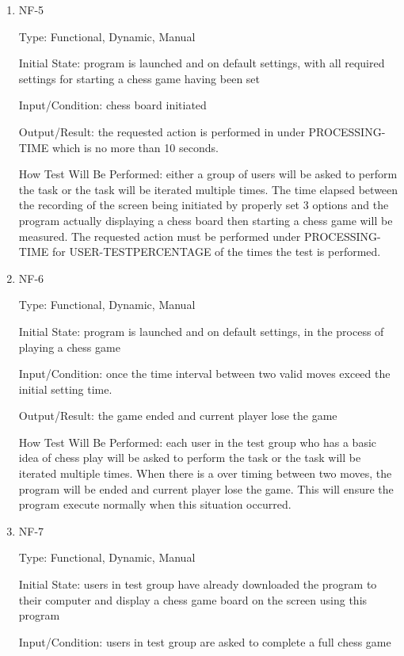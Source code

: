 \documentclass[12pt, titlepage]{article}
\begin{document}
\begin{enumerate}
\item{NF-5\\}

Type: Functional, Dynamic, Manual

Initial State: program is launched and on default settings, with all required settings for starting a chess game having been set

Input/Condition: chess board initiated

Output/Result: the requested action is performed in under PROCESSING-TIME which is no more than 10 seconds.

How Test Will Be Performed: either a group of users will be asked to perform the task or the task will be iterated multiple times. The time elapsed between the recording of the screen being initiated by properly set 3 options and the program actually displaying a chess board then starting a chess game will be measured. The requested action must be performed under PROCESSING-TIME for USER-TESTPERCENTAGE of the times the test is performed.

\item{NF-6\\}

Type: Functional, Dynamic, Manual

Initial State: program is launched and on default settings, in the process of playing a chess game

Input/Condition: once the time interval between two valid moves exceed the initial setting time.

Output/Result: the game ended and current player lose the game

How Test Will Be Performed: each user in the test group who has a basic idea of chess play will be asked to perform the task or the task will be iterated multiple times. When there is a over timing between two moves, the program will be ended and current player lose the game. This will ensure the program execute normally when this situation occurred.

\item{NF-7\\}

Type:  Functional, Dynamic, Manual

Initial State: users in test group have already downloaded the program to their computer and display a chess game board on the screen using this program 

Input/Condition: users in test group are asked to complete a full chess game


\end{enumerate}
\end{document}
